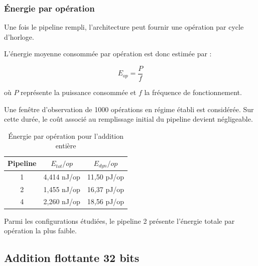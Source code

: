\documentclass[12pt,a4paper]{article}
\begin{document}

\subsubsection{Énergie par opération}

Une fois le pipeline rempli, l'architecture peut fournir une
opération par cycle d'horloge.

L'énergie moyenne consommée par opération est donc estimée par :

\begin{equation}
    E_{op} = \frac{P}{f}
\end{equation}

où $P$ représente la puissance consommée et $f$ la fréquence
de fonctionnement.

Une fenêtre d'observation de 1000 opérations en régime établi
est considérée. Sur cette durée, le coût associé au remplissage
initial du pipeline devient négligeable.

\begin{table}[H]
    \centering

    \caption{Énergie par opération pour l'addition entière}

    \begin{tabular}{ccc}
        \toprule

        \textbf{Pipeline} &
        \textbf{$E_{tot}/op$} &
        \textbf{$E_{dyn}/op$} \\

        \midrule

        1 & 4,414 nJ/op & 11,50 pJ/op \\
        2 & 1,455 nJ/op & 16,37 pJ/op \\
        4 & 2,260 nJ/op & 18,56 pJ/op \\

        \bottomrule
    \end{tabular}
\end{table}

Parmi les configurations étudiées, le pipeline 2 présente
l'énergie totale par opération la plus faible.



\subsection{Addition flottante 32 bits}
\end{document}
